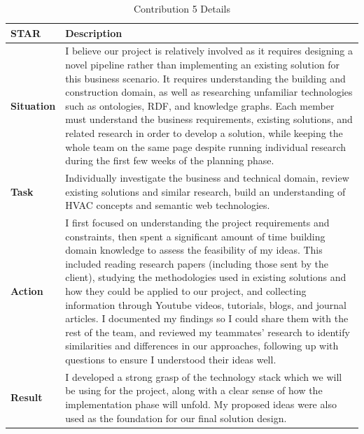 \documentclass{article}
\begin{document}
    \begin{xltabular}{\textwidth}{p{2cm} X}
    \caption{Contribution 5 Details} \\
    \hline
    \textbf{STAR} & \textbf{Description} \\
    \hline
    \endfirsthead

    \hline
    \endlastfoot

    \textbf{Situation} & I believe our project is relatively involved as it requires designing a novel pipeline rather than implementing an existing solution for this business scenario. It requires understanding the building and construction domain, as well as researching unfamiliar technologies such as ontologies, RDF, and knowledge graphs. Each member must understand the business requirements, existing solutions, and related research in order to develop a solution, while keeping the whole team on the same page despite running individual research during the first few weeks of the planning phase. \\

    \textbf{Task} & Individually investigate the business and technical domain, review existing solutions and similar research, build an understanding of HVAC concepts and semantic web technologies. \\

    \textbf{Action} & I first focused on understanding the project requirements and constraints, then spent a significant amount of time building domain knowledge to assess the feasibility of my ideas. This included reading research papers (including those sent by the client), studying the methodologies used in existing solutions and how they could be applied to our project, and collecting information through Youtube videos, tutorials, blogs, and journal articles. I documented my findings so I could share them with the rest of the team, and reviewed my teammates' research to identify similarities and differences in our approaches, following up with questions to ensure I understood their ideas well. \\

    \textbf{Result} & I developed a strong grasp of the technology stack which we will be using for the project, along with a clear sense of how the implementation phase will unfold. My proposed ideas were also used as the foundation for our final solution design. \\

    \end{xltabular}
\end{document}
